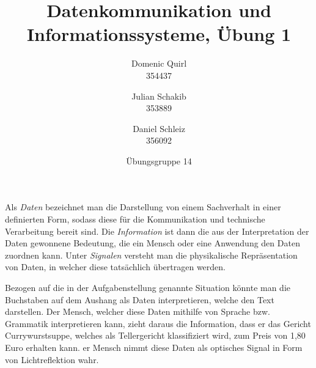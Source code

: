 \documentclass{../exercisesheet}
\title{Datenkommunikation und Informationssysteme, Übung 1}
\author{
    Domenic Quirl \\ 354437
    \and
    Julian Schakib \\ 353889
    \and 
    Daniel Schleiz \\ 356092
}
\date{Übungsgruppe 14}
\begin{document}
\maketitle
\pointtable

\begin{exercise}{3}
	Als \textit{Daten} bezeichnet man die Darstellung von einem Sachverhalt in einer definierten Form, sodass diese für die Kommunikation und technische Verarbeitung bereit sind.
	Die \textit{Information} ist dann die aus der Interpretation der Daten gewonnene Bedeutung, die ein Mensch oder eine Anwendung den Daten zuordnen kann. Unter \textit{Signalen}
	versteht man die physikalische Repräsentation von Daten, in welcher diese tatsächlich übertragen werden. \par
	Bezogen auf die in der Aufgabenstellung genannte Situation könnte man die Buchstaben auf dem Aushang als Daten interpretieren, welche den Text darstellen. Der Mensch,
	welcher diese Daten mithilfe von Sprache bzw. Grammatik interpretieren kann, zieht daraus die Information, dass er das Gericht Currywurstsuppe, welches als Tellergericht
	klassifiziert wird, zum Preis von 1,80 Euro erhalten kann. er Mensch nimmt diese Daten als optisches Signal in Form von Lichtreflektion wahr.\\
\end{exercise}

\begin{exercise}{5}
	\begin{subexercise}
		
	\end{subexercise}

	\begin{subexercise}
		  
	\end{subexercise}
\end{exercise}
\end{document}
